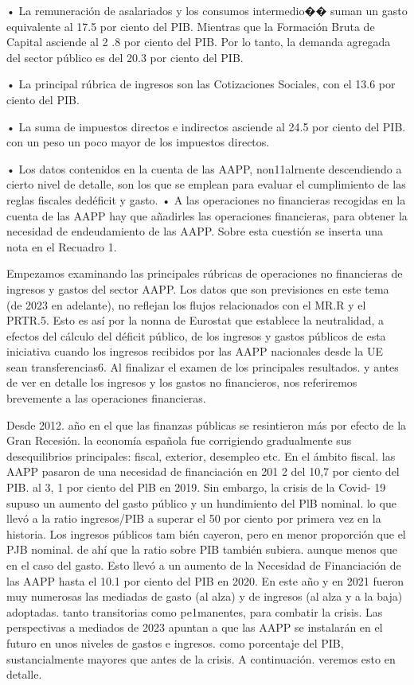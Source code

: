 \documentclass[10pt,a4paper]{article}
\begin{document}
{    • La remuneración de asalariados y los consumos intermedio�� suman un gasto equivalente al 17.5 por ciento del PIB. Mientras que la Formación Bruta de Capital asciende al 2 .8 por ciento del PIB. Por lo tanto, la demanda agregada del sector público es del 20.3 por ciento del PIB.

    • La principal rúbrica de ingresos son las Cotizaciones Sociales, con el 13.6 por ciento del PIB. 

    • La suma de impuestos directos e indirectos asciende al 24.5 por ciento del PIB. con un peso un poco mayor de los impuestos directos.

    • Los datos contenidos en la cuenta de las AAPP, non11alrnente descendiendo a cierto nivel de detalle, son los que se emplean para evaluar el cumplimiento de las reglas fiscales dedéficit y gasto.
    • A las operaciones no financieras recogidas en la cuenta de las AAPP hay que añadirles las operaciones financieras, para obtener la necesidad de endeudamiento de las AAPP. Sobre esta cuestión se inserta una nota en el Recuadro 1.
}

Empezamos examinando las principales rúbricas de operaciones no financieras de ingresos y gastos del sector AAPP. Los datos que son previsiones en este tema (de 2023 en adelante), no reflejan los flujos relacionados con el MR.R y el PRTR.5. Esto es así por la nonna de Eurostat que establece la neutralidad, a efectos del cálculo del déficit público, de los ingresos y gastos públicos de esta iniciativa cuando los ingresos recibidos por las AAPP nacionales desde la UE sean transferencias6. Al finalizar el examen de los principales resultados. y antes de ver en detalle los ingresos y los gastos no financieros, nos referiremos brevemente a las operaciones financieras. 

Desde 2012. año en el que las finanzas públicas se resintieron más por efecto de la Gran Recesión. la economía española fue corrigiendo gradualmente sus desequilibrios principales: fiscal, exterior, desempleo etc. En el ámbito fiscal. las AAPP pasaron de una necesidad de financiación en 201 2 del 10,7 por ciento del PIB. al 3, 1 por ciento del PlB en 2019. Sin embargo, la crisis de la Covid- 19 supuso un aumento del gasto público y un hundimiento del PlB nominal. lo que llevó a la ratio ingresos/PIB a superar el 50 por ciento por primera vez en la historia. Los ingresos públicos tam bién cayeron, pero en menor proporción que el PJB nominal. de ahí que la ratio sobre PIB también subiera. aunque menos que en el caso del gasto. Esto llevó a un aumento de la Necesidad de Financiación de las AAPP hasta el 10.1 por ciento del PIB en 2020. En este año y en 2021 fueron muy numerosas las mediadas de gasto (al alza) y de ingresos (al alza y a la baja) adoptadas. tanto transitorias como pe1manentes, para combatir la crisis. Las perspectivas a mediados de 2023 apuntan a que las AAPP se instalarán en el futuro en unos niveles de gastos e ingresos. como porcentaje del PIB, sustancialmente mayores que antes de la crisis. A continuación. veremos esto en detalle.
\end{document}
